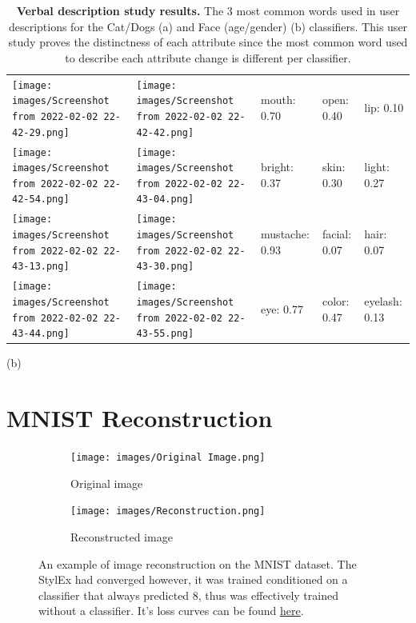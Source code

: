 \begin{table}[H]
\begin{minipage}{.5\linewidth}
{\begin{tabular}{m{1.1cm}|m{1.1cm}|m{1.1cm}|m{1.1cm}|m{1.1cm}}
\texttt{[image: images/Screenshot from 2022-02-02 22-42-29.png]} & \texttt{[image: images/Screenshot from 2022-02-02 22-42-42.png]} & {mouth: 0.70} & {open: 0.40} & lip: \hspace{0.8cm} 0.10       \\
\texttt{[image: images/Screenshot from 2022-02-02 22-42-54.png]} & \texttt{[image: images/Screenshot from 2022-02-02 22-43-04.png]} & {bright: 0.37} & {skin: 0.30} & light: 0.27     \\
\texttt{[image: images/Screenshot from 2022-02-02 22-43-13.png]} & \texttt{[image: images/Screenshot from 2022-02-02 22-43-30.png]} & {mustache: 0.93} & {facial: 0.07} & hair: 0.07      \\
\texttt{[image: images/Screenshot from 2022-02-02 22-43-44.png]} & \texttt{[image: images/Screenshot from 2022-02-02 22-43-55.png]} & {eye: \hspace{0.8cm} 0.77} & {color: 0.47} & eyelash: 0.13  
\end{tabular}}
\caption*{(b)}
\end{minipage}
\caption{\textbf{Verbal description study results.} The 3 most common words used in user descriptions for the Cat/Dogs (a) and Face (age/gender) (b) classifiers. This user study proves the distinctness of each attribute since the most common word used to describe each attribute change is different per classifier.}
\label{tab:top3}
\end{table}
\section{MNIST Reconstruction}
\label{app:MNIST_Reconstruct}
\begin{figure}[H]
    \centering
    \begin{subfigure}[]{0.3\textwidth}
         \centering
         \texttt{[image: images/Original Image.png]}
         \caption{Original image}
         \label{fig:y equals x}
     \end{subfigure}
     \hspace{10pt}
     \begin{subfigure}[]{0.3\textwidth}
         \centering
         \texttt{[image: images/Reconstruction.png]}
         \caption{Reconstructed image}
     \end{subfigure}
    \caption{An example of image reconstruction on the MNIST dataset. The StylEx had converged however, it was trained conditioned on a classifier that always predicted 8, thus was effectively trained without a classifier. It's loss curves can be found { \href{https://app.labml.ai/run/841a8fde81b511eca9da0242ac1c0002}{here}}.}
    \label{fig:MNIST_Reconstruct}
\end{figure}
